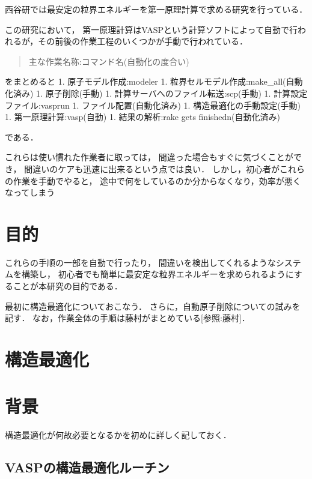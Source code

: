     西谷研では最安定の粒界エネルギーを第一原理計算で求める研究を行っている．

この研究において，
第一原理計算はVASPという計算ソフトによって自動で行われるが，その前後の作業工程のいくつかが手動で行われている．

\begin{quote}
主な作業名称:コマンド名(自動化の度合い)
\end{quote}
をまとめると 1. 原子モデル作成:modeler 1.
粒界セルモデル作成:make\_all(自動化済み) 1. 原子削除(手動) 1.
計算サーバへのファイル転送:scp(手動) 1. 計算設定ファイル:vasprun 1.
ファイル配置(自動化済み) 1. 構造最適化の手動設定(手動) 1.
第一原理計算:vasp(自動) 1. 結果の解析:rake gets finishedn(自動化済み)

である．

これらは使い慣れた作業者に取っては，
間違った場合もすぐに気づくことができ，
間違いのケアも迅速に出来るという点では良い．
しかし，初心者がこれらの作業を手動でやると，
途中で何をしているのか分からなくなり，効率が悪くなってしまう

\section{目的}\label{ux76eeux7684}

これらの手順の一部を自動で行ったり，
間違いを検出してくれるようなシステムを構築し，
初心者でも簡単に最安定な粒界エネルギーを求められるようにすることが本研究の目的である．

最初に構造最適化についておこなう．
さらに，自動原子削除についての試みを記す．
なお，作業全体の手順は藤村がまとめている{[}参照:藤村{]}．

    \section{構造最適化}\label{ux69cbux9020ux6700ux9069ux5316}

    \section{背景}\label{ux80ccux666f}

構造最適化が何故必要となるかを初めに詳しく記しておく．

    \subsection{VASPの構造最適化ルーチン}\label{vaspux306eux69cbux9020ux6700ux9069ux5316ux30ebux30fcux30c1ux30f3}

